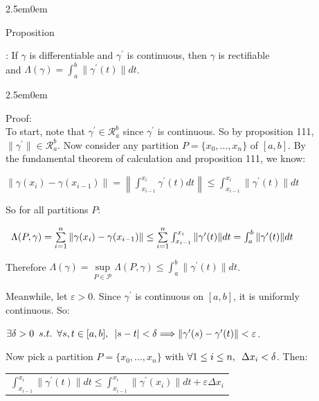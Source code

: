 \documentclass{book}
\newcommand{\hTwo}{%
   \color{MidnightBlue}%
   \fontsize{13}{15}\selectfont%
}
\newcommand{\hThree}{%
   \color{PineGreen!85!Orange}
   \fontsize{13}{15}\selectfont%
}
\newenvironment{myIndent}{%
   \begin{adjustwidth}{2.5em}{0em}%
}{%
   \end{adjustwidth}%
}
\newcommand{\suchthat}{ \hspace{0.5em}s.t.\hspace{0.5em}}
\newcommand{\myHS}{ \hspace{0.5em}}
\newcounter{PropNumber}
\newcommand{\propCount}[1][1]{%
   \addtocounter{PropNumber}{#1}%
   \thePropNumber%
}
\newcommand{\retTwo}{\hfill\bigbreak}
\begin{document}
{\begin{myIndent}\hTwo
   Proposition \propCount: If $\gamma$ is differentiable and $\gamma^\prime$ is continuous, then $\gamma$ is rectifiable\\ and $\Lambda(\gamma) = \int_a^b \|\gamma^\prime(t)\|dt$.\retTwo
   
   {\begin{myIndent}\hThree
      Proof:\\
      To start, note that $\gamma^\prime \in \mathscr{R}_a^b$ since $\gamma^\prime$ is continuous. So by proposition 111,\\ $\|\gamma^\prime\| \in \mathscr{R}_a^b$. Now consider any partition $P = \{x_0, \ldots, x_n\}$ of $[a, b]$. By\\ the fundamental theorem of calculation and proposition 111, we know:

      {\centering $ \|\gamma(x_i) - \gamma(x_{i-1})\| = \left\|\int_{x_{i-1}}^{x_i} \gamma^\prime(t)dt\right\| \leq \int_{x_{i-1}}^{x_i}\|\gamma^\prime(t)\|dt$ \retTwo\par}

      So for all partitions $P$:
      
      {\centering $\myHS \Lambda(P, \gamma) = \sum\limits_{i=1}^n\|\gamma(x_i) - \gamma(x_{i-1})\| \leq \sum\limits_{i=1}^n \int_{x_{i-1}}^{x_i}\|\gamma^\prime(t)\|dt = \int_a^b\|\gamma^\prime(t)\|dt$ \retTwo\par}

      Therefore $\Lambda(\gamma) = \sup\limits_{P \in \mathcal{P}} \Lambda(P, \gamma) \leq \int_a^b \|\gamma^\prime(t)\|dt$.\retTwo

      Meanwhile, let $\varepsilon > 0$. Since $\gamma^\prime$ is continuous on $[a, b]$, it is uniformly\\ continuous. So:
      
      {\centering $\exists\delta > 0 \suchthat \forall s, t \in [a, b], \myHS |s-t| < \delta \Longrightarrow \|\gamma^\prime(s) - \gamma^\prime(t)\| < \varepsilon$. \retTwo\par}

      Now pick a partition $P = \{x_0, \ldots, x_n\}$ with $\forall 1 \leq i \leq n,\myHS \Delta x_i < \delta$. Then:\\ [-9pt]

      {\center 
      \begin{tabular}{l}
         $\int_{x_{i-1}}^{x_i} \|\gamma^\prime(t)\|dt \leq \int_{x_{i-1}}^{x_i} \|\gamma^\prime(x_i)\|dt + \varepsilon \Delta x_{i}$\\ [3pt]


\end{tabular}}
\end{myIndent}}
\end{myIndent}}
\end{document}
